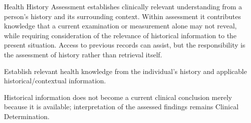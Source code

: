 Health History Assessment establishes clinically relevant understanding from a person's history and its surrounding context. Within assessment it contributes knowledge that a current examination or measurement alone may not reveal, while requiring consideration of the relevance of historical information to the present situation. Access to previous records can assist, but the responsibility is the assessment of history rather than retrieval itself.



Establish relevant health knowledge from the individual’s history and applicable historical/\allowbreak{}contextual information.



Historical information does not become a current clinical conclusion merely because it is available; interpretation of the assessed findings remains Clinical Determination.


